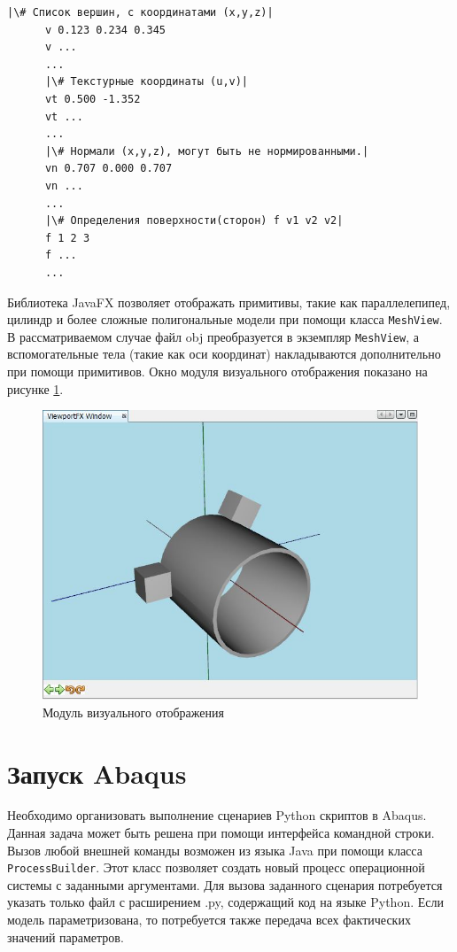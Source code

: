 \documentclass[14pt,oneside,final]{extreport}
\begin{document}
	\begin{lstlisting}[style=nonumbers]
	  |\# Список вершин, с координатами (x,y,z)|
	  v 0.123 0.234 0.345
	  v ...
	  ...
	  |\# Текстурные координаты (u,v)|
	  vt 0.500 -1.352
	  vt ...
	  ...
	  |\# Нормали (x,y,z), могут быть не нормированными.|
	  vn 0.707 0.000 0.707
	  vn ...
	  ...
	  |\# Определения поверхности(сторон) f v1 v2 v2|
	  f 1 2 3
	  f ...
	  ...
	\end{lstlisting} 

	Библиотека JavaFX позволяет отображать примитивы, такие как параллелепипед, цилиндр и более сложные полигональные модели при помощи класса \texttt{MeshView}. В рассматриваемом случае файл obj преобразуется в экземпляр \texttt{MeshView}, а вспомогательные тела (такие как оси координат) накладываются дополнительно при помощи примитивов. Окно модуля визуального отображения показано на рисунке \ref{fig:viewport-screen}.
	
	\begin{figure}[!h]
		\begin{center}
			\includegraphics[width=1\textwidth]{img/viewport-screen} 
		\end{center}
		\caption{Модуль визуального отображения}
		\label{fig:viewport-screen}
	\end{figure}	 

	\section{Запуск Abaqus}	 
	Необходимо организовать выполнение сценариев Python скриптов в Abaqus. Данная задача может быть решена при помощи интерфейса командной строки. Вызов любой внешней команды возможен из языка Java при помощи класса \texttt{ProcessBuilder}. Этот класс позволяет создать новый процесс операционной системы с заданными аргументами. Для вызова заданного сценария потребуется указать только файл с расширением .py, содержащий код на языке Python. Если модель параметризована, то потребуется также передача всех фактических значений параметров.
		
\end{document}
